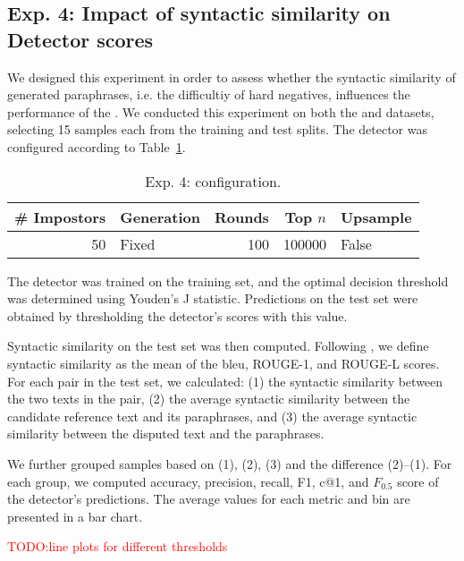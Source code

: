 \subsection{Exp. 4: Impact of syntactic similarity on \imp{} Detector scores}
\label{sec:syn_sim_impact_}

We designed this experiment in order to assess whether the syntactic similarity of generated paraphrases, i.e. the difficultiy of hard negatives, influences the performance of the \impAppr{}.
We conducted this experiment on both the \dataBlog{} and \dataStudent{} datasets, selecting 15 samples each from the training and test splits. 
The detector was configured according to Table~\ref{tab:imp_syn_sim_config}.

\begin{table}[h]
\centering\small
\caption{Exp. 4: \impAppr{} configuration.}
\label{tab:imp_syn_sim_config}
\begin{tabular}{@{}rlrrl@{}}   %
\toprule
\# Impostors & Generation & Rounds & Top $n$ & Upsample \\
\midrule
50 & Fixed & 100 & \num{100000} & False \\
\bottomrule
\end{tabular}%
\end{table}

The detector was trained on the training set, and the optimal decision threshold was determined using Youden’s J statistic. 
Predictions on the test set were obtained by thresholding the detector’s scores with this value.

Syntactic similarity on the test set was then computed. 
Following \citet{gohsen_captions_2023}, we define syntactic similarity as the mean of the  \ac{bleu}, ROUGE-1, and ROUGE-L scores. 
For each pair in the test set, we calculated:
(1) the syntactic similarity between the two texts in the pair, (2) the average syntactic similarity between the candidate reference text and its paraphrases, and (3) the average syntactic similarity between the disputed text and the paraphrases.

We further grouped samples based on (1), (2), (3) and the difference (2)–(1). 
For each group, we computed accuracy, precision, recall, F1, c@1, and $F_{0.5}$ score of the detector’s predictions. 
The average values for each metric and bin are presented in a bar chart.

\textcolor{red}{TODO:line plots for different thresholds}
